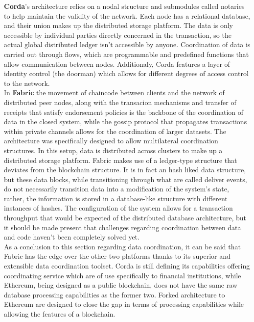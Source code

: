 \textbf{Corda}'s architecture relies on a nodal structure and submodules called notaries to help maintain the validity of the network. Each node has a relational database, and their union makes up the distributed storage platform. The data is only accessible by individual parties directly concerned in the transaction, so the actual global distributed ledger isn't accessible by anyone. Coordination of data is carried out through flows, which are programmable and predefined functions that allow communication between nodes. Additionaly, Corda features a layer of identity control (the doorman) which allows for different degrees of access control to the network.
\\

In \textbf{Fabric} the movement of chaincode between clients and the network of distributed peer nodes, along with the transacion mechanisms and transfer of receipts that satisfy endorsement policies is the backbone of the coordination of data in the closed system, while the gossip protocol that propagates transactions within private channels allows for the coordination of larger datasets. The architecture was specifically designed to allow multilateral coordination structures. In this setup, data is distributed across clusters to make up a distributed storage platform. Fabric makes use of a ledger-type structure that deviates from the blockchain structure. It is in fact an hash liked data structure, but these data blocks, while transitioning through what are called deliver events, do not necessarily transition data into a modification of the system's state, rather, the information is stored in a database-like structure with different instances of hashes.
The configuration of the system allows for a transaction throughput that would be expected of the distributed database architecture, but it should be made present that challenges regarding coordination between data and code haven't been completely solved yet.
\\


As a conclusion to this section regarding data coordination, it can be said that Fabric has the edge over the other two platforms thanks to its superior and extensible data coordination toolset. Corda is still defining its capabilities offering coordinating service which are of use specifically to financial institutions, while Ethereum, being designed as a public blockchain, does not have the same raw database processing capabilities as the former two. Forked architecture to Ethereum are designed to close the gap in terms of processing capabilities while allowing the features of a blockchain.

